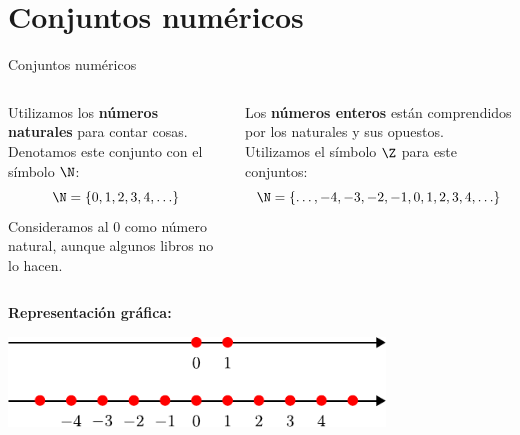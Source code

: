 \documentclass[9pt, aspectratio=169]{beamer}
\begin{document}
\section{Conjuntos numéricos}

\begin{frame}{Conjuntos numéricos}
\begin{columns}[t]
\cx
\begin{definition}
Utilizamos los \textbf{números naturales} para contar cosas. Denotamos este conjunto con el símbolo $\N$:
\[ \N = \{0, 1, 2, 3, 4, \ldots \} \]
Consideramos al $0$ como número natural, aunque algunos libros no lo hacen.
\end{definition}
\cx
\begin{definition}
Los \textbf{números enteros} están comprendidos por los naturales y sus opuestos. Utilizamos el símbolo $\Z$ para este conjuntos:
\[ \N = \{\ldots, -4, -3, -2, -1, 0, 1, 2, 3, 4, \ldots \} \]
\end{definition}
\end{columns}

\textbf{Representación gráfica:}
\begin{center}
    \includegraphics[width=0.75\textwidth]{figs/fig-12.pdf}
\end{center}

\end{frame}
\end{document}
